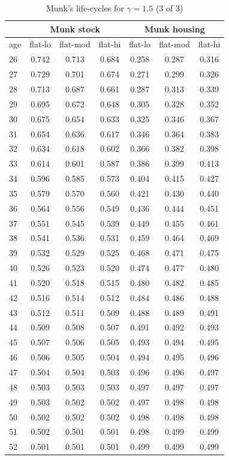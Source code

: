 \documentclass[]{elsarticle}
\begin{document}
\begin{appendix}
\begin{table}[H]
	\centering
	\caption[]{Munk's life-cycles for $\gamma = 1.5$ (3 of 3)}
	\begin{tabular}[c]{lcccccc}
&\multicolumn{3}{c}{Munk stock}&\multicolumn{3}{c}{Munk housing}\\
		\hline
age&flat-lo&flat-mod&flat-hi&flat-lo&flat-mod&flat-hi\\
		\hline
26&0.742&0.713&0.684&0.258&0.287&0.316\\
27&0.729&0.701&0.674&0.271&0.299&0.326\\
28&0.713&0.687&0.661&0.287&0.313&0.339\\
29&0.695&0.672&0.648&0.305&0.328&0.352\\
30&0.675&0.654&0.633&0.325&0.346&0.367\\
31&0.654&0.636&0.617&0.346&0.364&0.383\\
32&0.634&0.618&0.602&0.366&0.382&0.398\\
33&0.614&0.601&0.587&0.386&0.399&0.413\\
34&0.596&0.585&0.573&0.404&0.415&0.427\\
35&0.579&0.570&0.560&0.421&0.430&0.440\\
36&0.564&0.556&0.549&0.436&0.444&0.451\\
37&0.551&0.545&0.539&0.449&0.455&0.461\\
38&0.541&0.536&0.531&0.459&0.464&0.469\\
39&0.532&0.529&0.525&0.468&0.471&0.475\\
40&0.526&0.523&0.520&0.474&0.477&0.480\\
41&0.520&0.518&0.515&0.480&0.482&0.485\\
42&0.516&0.514&0.512&0.484&0.486&0.488\\
43&0.512&0.511&0.509&0.488&0.489&0.491\\
44&0.509&0.508&0.507&0.491&0.492&0.493\\
45&0.507&0.506&0.505&0.493&0.494&0.495\\
46&0.506&0.505&0.504&0.494&0.495&0.496\\
47&0.504&0.504&0.503&0.496&0.496&0.497\\
48&0.503&0.503&0.503&0.497&0.497&0.497\\
49&0.503&0.502&0.502&0.497&0.498&0.498\\
50&0.502&0.502&0.502&0.498&0.498&0.498\\
51&0.502&0.501&0.501&0.498&0.499&0.499\\
52&0.501&0.501&0.501&0.499&0.499&0.499\\

\end{tabular}
\end{table}
\end{appendix}
\end{document}
